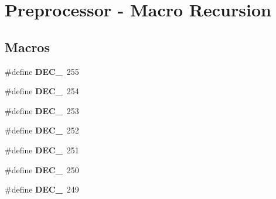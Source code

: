 \hypertarget{group__group__sam0__utils__mrecursion}{}\section{Preprocessor -\/ Macro Recursion}
\label{group__group__sam0__utils__mrecursion}
\subsection*{Macros}
\begin{DoxyCompactItemize}
\item 
\hypertarget{group__group__sam0__utils__mrecursion_ga122e290d834df60c7dc9592ba061a1df}{}\#define {\bfseries D\+E\+C\+\_}~255\label{group__group__sam0__utils__mrecursion_ga122e290d834df60c7dc9592ba061a1df}

\item 
\hypertarget{group__group__sam0__utils__mrecursion_gae3d83bd50fb00451e7af3b4faef1a2ca}{}\#define {\bfseries D\+E\+C\+\_}~254\label{group__group__sam0__utils__mrecursion_gae3d83bd50fb00451e7af3b4faef1a2ca}

\item 
\hypertarget{group__group__sam0__utils__mrecursion_ga78c3db4ef9a8fd8488c08ce221e07391}{}\#define {\bfseries D\+E\+C\+\_}~253\label{group__group__sam0__utils__mrecursion_ga78c3db4ef9a8fd8488c08ce221e07391}

\item 
\hypertarget{group__group__sam0__utils__mrecursion_ga884962cfd717b002080c1c83657089cd}{}\#define {\bfseries D\+E\+C\+\_}~252\label{group__group__sam0__utils__mrecursion_ga884962cfd717b002080c1c83657089cd}

\item 
\hypertarget{group__group__sam0__utils__mrecursion_ga65a84cf9c3eb76353a932fcfa1dfd6ff}{}\#define {\bfseries D\+E\+C\+\_}~251\label{group__group__sam0__utils__mrecursion_ga65a84cf9c3eb76353a932fcfa1dfd6ff}

\item 
\hypertarget{group__group__sam0__utils__mrecursion_ga9c91e5cacff15380b0e78a5e9cc20381}{}\#define {\bfseries D\+E\+C\+\_}~250\label{group__group__sam0__utils__mrecursion_ga9c91e5cacff15380b0e78a5e9cc20381}

\item 
\hypertarget{group__group__sam0__utils__mrecursion_ga22d3ed5a519592f9318cb2f9e2fc28ff}{}\#define {\bfseries D\+E\+C\+\_}~249\label{group__group__sam0__utils__mrecursion_ga22d3ed5a519592f9318cb2f9e2fc28ff}


\end{DoxyCompactItemize}
